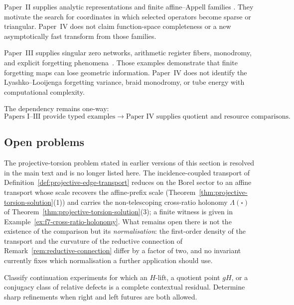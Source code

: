 Paper~II supplies analytic representations and finite affine--Appell families
\cite{Yuan2026AEGFunctionTheory}.  They motivate the search for coordinates in
which selected operators become sparse or triangular.  Paper~IV does not claim
function-space completeness or a new asymptotically fast transform from those
families.

Paper~III supplies singular zero networks, arithmetic register fibers,
monodromy, and explicit forgetting phenomena~\cite{Yuan2026AEGZeroGeometry}.
Those examples demonstrate that finite forgetting maps can lose geometric
information.  Paper~IV does not identify the Lyashko--Looijenga forgetting
variance, braid monodromy, or tube energy with computational complexity.

The dependency remains one-way:
\[
  \text{Papers I--III provide typed examples}
  \longrightarrow
  \text{Paper IV supplies quotient and resource comparisons}.
\]

\subsection{Open problems}

The projective-torsion problem stated in earlier versions of this section is
resolved in the main text and is no longer listed here.  The
incidence-coupled transport of
Definition~\ref{def:projective-edge-transport} reduces on the Borel sector to an
affine transport whose scale recovers the affine-prefix scale
(Theorem~\ref{thm:projective-torsion-solution}(1)) and carries the
non-telescoping cross-ratio holonomy
$\Lambda(\square)$ of Theorem~\ref{thm:projective-torsion-solution}(3); a finite
witness is given in Example~\ref{ex:f7-cross-ratio-holonomy}.  What remains open
there is not the existence of the comparison but its \emph{normalisation}: the
first-order density of the transport and the curvature of the reductive
connection of Remark~\ref{rem:reductive-connection} differ by a factor of two,
and no invariant currently fixes which normalisation a further application
should use.

\begin{problem}
Classify continuation experiments for which an $H$-lift, a quotient point
$gH$, or a conjugacy class of relative defects is a complete contextual
residual.  Determine sharp refinements when right and left futures are both
allowed.
\end{problem}

